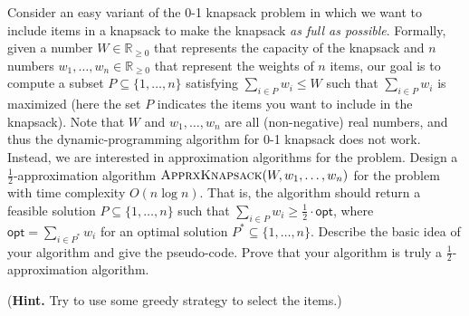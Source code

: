 \documentclass[letterpaper, 11pt]{article}
\newcommand{\1}{\mathds{1}}	%
\theoremstyle{definition}
\begin{document}
Consider an easy variant of the 0-1 knapsack problem in which we want to include items in a knapsack to make the knapsack \textit{as full as possible}.
Formally, given a number $W \in \mathbb{R}_{\geq 0}$ that represents the capacity of the knapsack and $n$ numbers $w_1,\dots,w_n \in \mathbb{R}_{\geq 0}$ that represent the weights of $n$ items, our goal is to compute a subset $P \subseteq \{1,\dots,n\}$ satisfying $\sum_{i \in P} w_i \leq W$ such that $\sum_{i \in P} w_i$ is maximized (here the set $P$ indicates the items you want to include in the knapsack).
Note that $W$ and $w_1,\dots,w_n$ are all (non-negative) real numbers, and thus the dynamic-programming algorithm for 0-1 knapsack does not work.
Instead, we are interested in approximation algorithms for the problem.
Design a $\frac{1}{2}$-approximation algorithm $\textsc{ApprxKnapsack}(W,w_1,\dots,w_n)$ for the problem with time complexity $O(n \log n)$.
That is, the algorithm should return a feasible solution $P \subseteq \{1,\dots,n\}$ such that $\sum_{i \in P} w_i \geq \frac{1}{2} \cdot \mathsf{opt}$, where $\mathsf{opt} = \sum_{i \in P^*} w_i$ for an optimal solution $P^* \subseteq \{1,\dots,n\}$.
Describe the basic idea of your algorithm and give the pseudo-code.
Prove that your algorithm is truly a $\frac{1}{2}$-approximation algorithm.

(\textbf{Hint.} Try to use some greedy strategy to select the items.)
\end{document}
